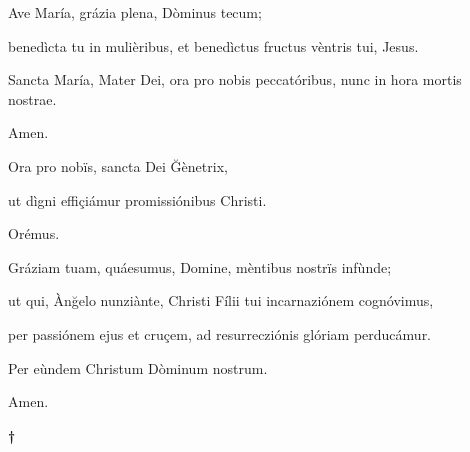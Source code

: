 \documentclass[twoside,10pt]{article}
\begin{document}
{  \noindent Ave María, grázia plena, Dòminus tecum;
  
  benedìcta tu in mulièribus, et benedìctus fructus vèntris tui, Jesus.

  Sancta María, Mater Dei, ora pro nobis peccatóribus, nunc in hora mortis nostrae.

  Amen.

  \bigskip

   Ora pro nobïs, sancta Dei Ğènetrix,

  \smallskip

   ut dìgni effiçiámur promissiónibus Christi.

  \bigskip

   Orémus.

  \bigskip

  \noindent Gráziam tuam, quáesumus, Domine, mèntibus nostrïs infùnde;

  ut qui, Ànğelo nunziànte, Christi Fílii tui incarnaziónem cognóvimus,

  per passiónem ejus et cruçem, ad resurrecziónis glóriam perducámur.

  Per eùndem Christum Dòminum nostrum.

  \bigskip

   Amen.

  \bigskip
  \medskip

  \begin{center}
  {\bfseries\large †}
  \end{center}

}
\end{document}
